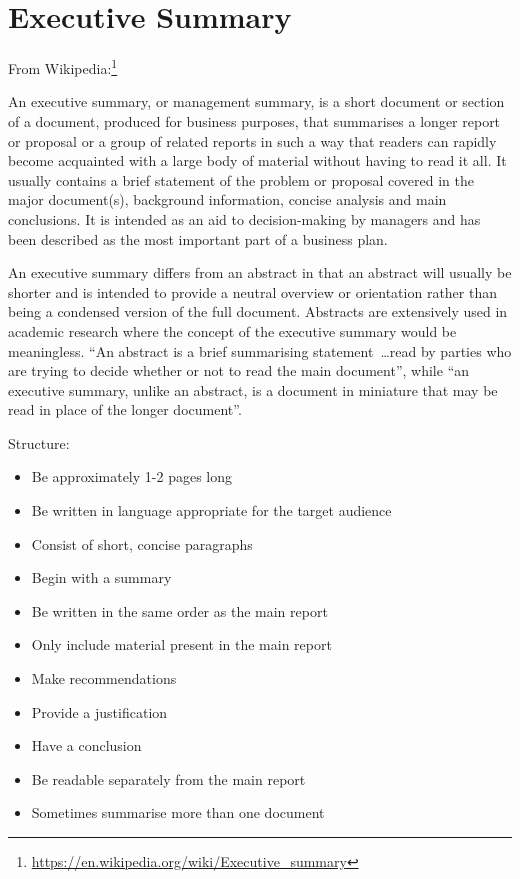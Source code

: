 
\clearpage
\section*{Executive Summary}
\label{sec:summary}


From Wikipedia:\footnote{\url{https://en.wikipedia.org/wiki/Executive_summary}}

An executive summary, or management summary, is a short document or section of a document, produced for business purposes, that summarises a longer report or proposal or a group of related reports in such a way that readers can rapidly become acquainted with a large body of material without having to read it all. It usually contains a brief statement of the problem or proposal covered in the major document(s), background information, concise analysis and main conclusions. 
It is intended as an aid to decision-making by managers and has been described as the most important part of a business plan.

An executive summary differs from an abstract in that an abstract will usually be shorter and is intended to provide a neutral overview or orientation rather than being a condensed version of the full document. Abstracts are extensively used in academic research where the concept of the executive summary would be meaningless. ``An abstract is a brief summarising statement~\dots read by parties who are trying to decide whether or not to read the main document'', while ``an executive summary, unlike an abstract, is a document in miniature that may be read in place of the longer document''.

Structure:
\begin{itemize}
	\item Be approximately 1-2 pages long
	\item Be written in language appropriate for the target audience
	\item Consist of short, concise paragraphs
	\item Begin with a summary
	\item Be written in the same order as the main report
	\item Only include material present in the main report
	\item Make recommendations
	\item Provide a justification
	\item Have a conclusion
	\item Be readable separately from the main report
	\item Sometimes summarise more than one document
\end{itemize}

